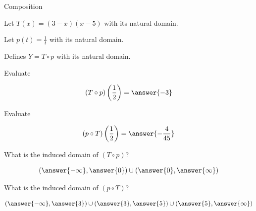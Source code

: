 \documentclass{ximera}
\begin{document}
\begin{example} Composition



Let $T(x) = (3-x)(x-5)$ with its natural domain.


Let $p(t) = \frac{1}{t}$ with its natural domain.


Defines $Y = T \circ p$ with its natural domain.



\begin{question}

Evaluate


\[
(T \circ p)\left( \frac{1}{2} \right) = \answer{-3}
\]



\end{question}






\begin{question}

Evaluate


\[
(p \circ T)\left( \frac{1}{2} \right) = \answer{-\frac{4}{45}}
\]



\end{question}





\begin{question}

What is the induced domain of $(T \circ p)$?


\[
\left( \answer{-\infty}, \answer{0}  \right) \cup \left( \answer{0}, \answer{\infty}  \right)
\]



\end{question}








\begin{question}

What is the induced domain of $(p \circ T)$?


\[
\left( \answer{-\infty}, \answer{3}  \right) \cup \left( \answer{3}, \answer{5}  \right)  \cup \left( \answer{5}, \answer{\infty}  \right)
\]



\end{question}







\end{example}
\end{document}
